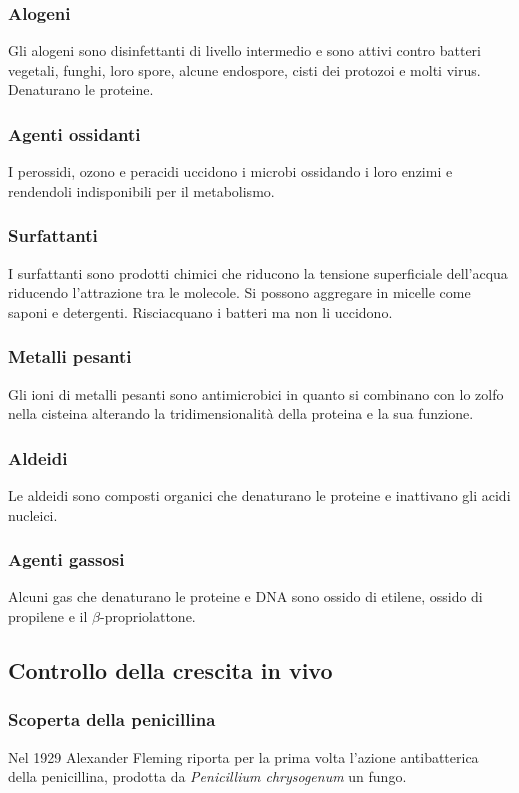 		\subsubsection{Alogeni}
		Gli alogeni sono disinfettanti di livello intermedio e sono attivi contro batteri vegetali, funghi, loro spore, alcune endospore, cisti dei protozoi e molti virus.
		Denaturano le proteine.

		\subsubsection{Agenti ossidanti}
		I perossidi, ozono e peracidi uccidono i microbi ossidando i loro enzimi e rendendoli indisponibili per il metabolismo.

		\subsubsection{Surfattanti}
		I surfattanti sono prodotti chimici che riducono la tensione superficiale dell'acqua riducendo l'attrazione tra le molecole.
		Si possono aggregare in micelle come saponi e detergenti.
		Risciacquano i batteri ma non li uccidono.

		\subsubsection{Metalli pesanti}
		Gli ioni di metalli pesanti sono antimicrobici in quanto si combinano con lo zolfo nella cisteina alterando la tridimensionalit\`a della proteina e la sua funzione.

		\subsubsection{Aldeidi}
		Le aldeidi sono composti organici che denaturano le proteine e inattivano gli acidi nucleici.

		\subsubsection{Agenti gassosi}
		Alcuni gas che denaturano le proteine e DNA sono ossido di etilene, ossido di propilene e il $\beta$-propriolattone.

	\subsection{Controllo della crescita in vivo}

		\subsubsection{Scoperta della penicillina}
		Nel 1929 Alexander Fleming riporta per la prima volta l'azione antibatterica della penicillina, prodotta da \textit{Penicillium chrysogenum} un fungo.
		
